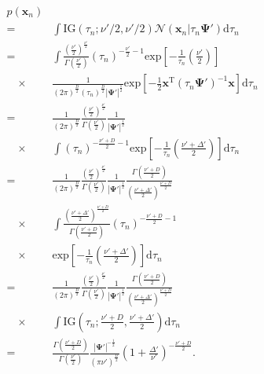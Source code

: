 \documentclass[journal]{IEEEtran}
\begin{document}
\begin{eqnarray}
	&p(\mathbf{x}_n) \nonumber\\ &=& \int \mathrm{IG}(\tau_n;\nu'/2,\nu'/2) \mathcal{N}(\mathbf{x}_n|\tau_n \mathbf{\Psi}') \mathrm{d}{\tau_n} \nonumber\\
	&=& \int \frac{\left(\frac{\nu'}{2}\right)^{\frac{\nu'}{2}}}{\Gamma \left(\frac{\nu'}{2}\right)} (\tau_n)^{-\frac{\nu'}{2}-1} \mathrm{exp} \left[-\frac{1}{\tau_n} \left(\frac{\nu'}{2} \right) \right] \nonumber\\
	&\quad\times&\frac{1}{(2\pi)^{\frac{D}{2}}(\tau_n)^{\frac{D}{2}}|\mathbf{\Psi'}|^{\frac{1}{2}}} \mathrm{exp} \left[-\frac{1}{2}\mathbf{x}^\mathrm{T} (\tau_n\mathbf{\Psi'})^{-1} \mathbf{x}\right] \mathrm{d}{\tau_n} \nonumber\\
	&=&\frac{1}{(2\pi)^{\frac{D}{2}}}\frac{\left(\frac{\nu'}{2}\right)^{\frac{\nu'}{2}}}{\Gamma \left(\frac{\nu'}{2}\right)}\frac{1}{|\mathbf{\Psi'}|^{\frac{1}{2}}} \nonumber\\
	&\quad\times& \int (\tau_n)^{-\frac{\nu'+D}{2}-1} \mathrm{exp} \left[-\frac{1}{\tau_n} \left(\frac{\nu' + \Delta'}{2}\right) \right] \mathrm{d}{\tau_n} \nonumber\\
	&=&\frac{1}{(2\pi)^{\frac{D}{2}}}\frac{\left(\frac{\nu'}{2}\right)^{\frac{\nu'}{2}}}{\Gamma \left(\frac{\nu'}{2}\right)}\frac{1}{|\mathbf{\Psi'}|^{\frac{1}{2}}} \frac{\Gamma \left(\frac{\nu'+D}{2}\right)}{\left(\frac{\nu'+\Delta'}{2}\right)^{\frac{\nu'+D}{2}}}\nonumber\\
	&\quad\times& \int \frac{\left(\frac{\nu'+\Delta'}{2}\right)^{\frac{\nu'+D}{2}}}{\Gamma \left(\frac{\nu'+D}{2}\right)} (\tau_n)^{-\frac{\nu'+D}{2}-1} \nonumber\\
	&\quad\times& \mathrm{exp} \left[-\frac{1}{\tau_n} \left(\frac{\nu' + \Delta'}{2}\right) \right] \mathrm{d}{\tau_n} \nonumber\\
	&=&\frac{1}{(2\pi)^{\frac{D}{2}}}\frac{\left(\frac{\nu'}{2}\right)^{\frac{\nu'}{2}}}{\Gamma \left(\frac{\nu'}{2}\right)}\frac{1}{|\mathbf{\Psi'}|^{\frac{1}{2}}} \frac{\Gamma \left(\frac{\nu'+D}{2}\right)}{\left(\frac{\nu'+\Delta'}{2}\right)^{\frac{\nu'+D}{2}}}\nonumber\\
	&\quad\times& \int \mathrm{IG}(\tau_n;\frac{\nu'+D}{2},\frac{\nu'+\Delta'}{2}) \mathrm{d}{\tau_n}\nonumber\\
	&=& \frac{\Gamma(\frac{\nu'+D}{2})}{\Gamma(\frac{\nu'}{2})} \frac{|{\bm \Psi'}|^{-\frac{1}{2}}}{\left(\pi \nu' \right)^{\frac{D}{2}}} \left(1+\frac{\Delta '}{\nu '} \right)^{-\frac{\nu'+D}{2}}.
\end{eqnarray}
\end{document}
